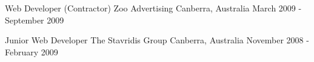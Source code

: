 \begin{cventries}
\vspace{-7.5mm}


\cventry
{Web Developer (Contractor)} %
{Zoo Advertising} %
{Canberra, Australia} %
{March 2009 - September 2009} %
{ %
\begin{cvitems}
\end{cvitems}
}
{}

\vspace{-7.5mm}


\cventry
{Junior Web Developer} %
{The Stavridis Group} %
{Canberra, Australia} %
{November 2008 - February 2009} %
{ %
\begin{cvitems}
\end{cvitems}
}
{}


\vspace{-7.5mm}

\end{cventries}